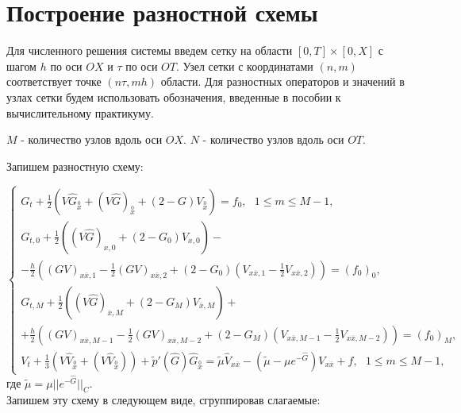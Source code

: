 \documentclass[a4paper, 11pt]{article}
\newcommand{\wide}{
\stackrel{0}{x}
}
\begin{document}
\section{Построение разностной схемы}
Для численного решения системы введем сетку на области $[0, T] \times [0, X]$ с шагом $h$ по оси $OX$ и $\tau$ по оси $OT$. Узел сетки с координатами $(n, m)$ соответствует точке $(n\tau, mh)$ области. Для разностных операторов и значений в узлах сетки будем использовать обозначения, введенные в пособии к вычислительному практикуму.

$M$ - количество узлов вдоль оси $OX$.
$N$ - количество узлов вдоль оси $OT$.

Запишем разностную схему:

$$
\begin{cases}
\displaystyle{G_t + \frac{1}{2}(V\hat{G}_{\wide} + (V\hat{G})_{\wide} + (2-G)V_{\wide}) = f_0},\ \ \ 1 \leqslant m \leqslant M - 1,\\
\displaystyle{G_{t,0} + \frac{1}{2} ((V\hat{G})_{x,0} + (2 - G_0)V_{x, 0})} - \\
\displaystyle{
-\frac{h}{2}((GV)_{x\overline{x}, 1} - 
\frac{1}{2}(GV)_{x\overline{x}, 2} + (2 - G_0)
(V_{x\overline{x}, 1} - 
\frac{1}{2}V_{x\overline{x}, 2})) = (f_0)_0},\\
\displaystyle{
G_{t, M} + \frac{1}{2}((V\hat{G})_{\overline{x}, M} + (2 - G_M)V_{\overline{x}, M}) +} \\ 
\displaystyle{+\frac{h}{2}((GV)_{x\overline{x}, M-1} - 
\frac{1}{2}(GV)_{x\overline{x}, M-2} + 
(2-G_M)(V_{x\overline{x}, M - 1} - 
\frac{1}{2}V_{x\overline{x}, M-2})) = (f_0)_M},\\
\displaystyle{V_t + \frac{1}{3}(V\hat{V}_{\wide} + (V\hat{V}_{\wide})) + \tilde{p}'(\hat{G})\hat{G}_{\wide} = \tilde{\mu}\hat{V}_{x\overline{x}} - 
(\tilde{\mu} - \mu e^{-\hat{G}})V_{x\overline{x}} + f},\ \ \  1 \leqslant m \leqslant M - 1,
\end{cases}
$$
где $\tilde{\mu} = \mu\vert\vert e^{-\hat{G}}\vert\vert_C$.
\\[5pt]
Запишем эту схему в следующем виде, сгруппировав слагаемые:
\end{document}
